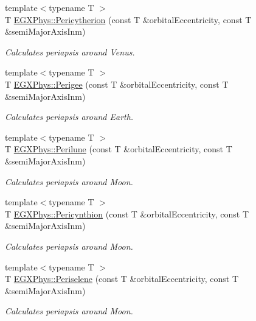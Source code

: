 \begin{DoxyCompactItemize}
{\footnotesize template$<$typename T $>$ }\\T \mbox{\hyperlink{group___e_g_x_phys-_periapsis_ga8abbd484b4a6e0958000c91644cbb8ee}{E\+G\+X\+Phys\+::\+Pericytherion}} (const T \&orbital\+Eccentricity, const T \&semi\+Major\+Axis\+Inm)
\begin{DoxyCompactList}\small\item\em Calculates periapsis around Venus. \end{DoxyCompactList}\item 
{\footnotesize template$<$typename T $>$ }\\T \mbox{\hyperlink{group___e_g_x_phys-_periapsis_gac6e1edb1916ff1a37f4bc0b01e6511d4}{E\+G\+X\+Phys\+::\+Perigee}} (const T \&orbital\+Eccentricity, const T \&semi\+Major\+Axis\+Inm)
\begin{DoxyCompactList}\small\item\em Calculates periapsis around Earth. \end{DoxyCompactList}\item 
{\footnotesize template$<$typename T $>$ }\\T \mbox{\hyperlink{group___e_g_x_phys-_periapsis_gac305fe72a19c1126bc7e72ef1de873a0}{E\+G\+X\+Phys\+::\+Perilune}} (const T \&orbital\+Eccentricity, const T \&semi\+Major\+Axis\+Inm)
\begin{DoxyCompactList}\small\item\em Calculates periapsis around Moon. \end{DoxyCompactList}\item 
{\footnotesize template$<$typename T $>$ }\\T \mbox{\hyperlink{group___e_g_x_phys-_periapsis_ga101f47cc9ce1eb98aeec35fa5c9ba9e4}{E\+G\+X\+Phys\+::\+Pericynthion}} (const T \&orbital\+Eccentricity, const T \&semi\+Major\+Axis\+Inm)
\begin{DoxyCompactList}\small\item\em Calculates periapsis around Moon. \end{DoxyCompactList}\item 
{\footnotesize template$<$typename T $>$ }\\T \mbox{\hyperlink{group___e_g_x_phys-_periapsis_ga91c6e1f3b6f98fe053bec87efcff4364}{E\+G\+X\+Phys\+::\+Periselene}} (const T \&orbital\+Eccentricity, const T \&semi\+Major\+Axis\+Inm)
\begin{DoxyCompactList}\small\item\em Calculates periapsis around Moon. \end{DoxyCompactList}\item 

\end{DoxyCompactItemize}
